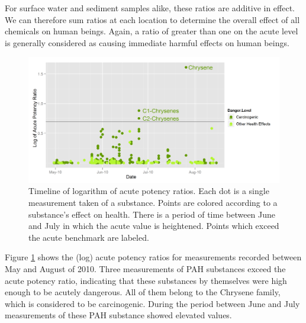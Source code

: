 \documentclass[authoryear,12pt]{elsarticle}
\begin{document}
For surface water and sediment samples alike, these ratios are additive in effect. We can therefore sum ratios at each location to determine the overall effect of all chemicals on human beings. {Again}, a ratio of greater than  {one} on the acute level  {is generally} considered as causing immediate harmful effects on human beings.


\begin{figure}[htbp] %
   \centering
   \includegraphics[width=5in]{acute-timeline.png} 
   \caption{Timeline of logarithm of acute potency ratios. Each dot is a single measurement taken of a substance. Points are colored according to a substance's effect on health. There is a period of time between June and July in which the acute value is heightened.  Points which exceed the acute benchmark are labeled.}
   \label{pah-timeline}
\end{figure}


Figure \ref{pah-timeline} shows the (log) acute potency ratios for measurements recorded between May and August of 2010. Three measurements of PAH substances exceed the acute potency ratio, indicating that these substances by themselves were high enough to be acutely dangerous. All of them belong to the Chrysene family, which  is considered to be carcinogenic. During the  period between June and July  measurements of these PAH substance showed elevated values.
\end{document}
